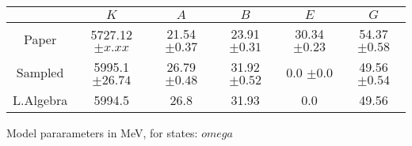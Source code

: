 \begin{tabular}{c | c  c  c  c  c }\hline \hline
          & $K$        & $A$             & $B$     & $E$        & $G$            \\ \hline
Paper     & 5727.12$\pm x.xx$ & 21.54$\pm 0.37$ & 23.91$\pm 0.31$ & 30.34 $\pm 0.23$ & 54.37$\pm 0.58$ \\ 
Sampled   & 5995.1  $\pm 26.74 $ & 26.79  $\pm 0.48 $ & 31.92  $\pm 0.52 $ & 0.0  $\pm 0.0 $ & 49.56  $\pm 0.54 $ \\ 
L.Algebra & 5994.5  & 26.8  & 31.93  & 0.0 & 49.56  \\ 
\hline\hline
\end{tabular}
\caption{Model pararameters in MeV, for states: $ omega $}
